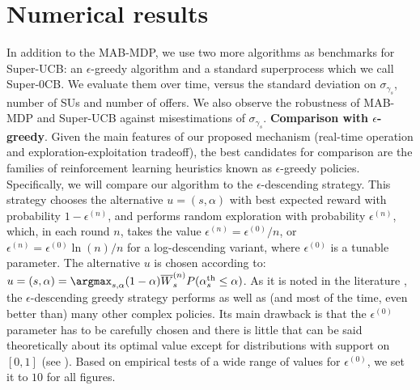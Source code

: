 \section{Numerical results}\label{sec:Num}
In addition to the MAB-MDP, we use two more algorithms as benchmarks for Super-UCB: an $\epsilon$-greedy algorithm and a standard superprocess which we call Super-0CB. We evaluate them over time, versus the standard deviation on $\sigma_{\gamma_s}$, number of SUs and number of offers. We also observe the robustness of MAB-MDP and Super-UCB against misestimations of $\sigma_{\gamma_s}$.
\textbf{Comparison with $\epsilon$-greedy}.
Given the main features of our proposed mechanism (real-time operation and exploration-exploitation tradeoff), the best candidates for comparison are the families of reinforcement learning heuristics \cite{ref:Vermorel2005} known as $\epsilon$-greedy policies.
Specifically, we will compare our algorithm to the $\epsilon$-descending strategy. 
This strategy chooses the alternative $u = (s,\alpha)$ with best expected reward with probability $1-\epsilon^{(n)}$, and performs random exploration with probability $\epsilon^{(n)}$, which, in each round $n$, takes the value $\epsilon^{(n)} = \epsilon^{(0)}/n$, or $\epsilon^{(n)} = \epsilon^{(0)}\ln(n)/n$ for a log-descending variant, where $\epsilon^{(0)}$ is a tunable parameter. The alternative $u$ is chosen according to: $u = (s,\alpha) = \argmax_{s,\alpha} (1-\alpha)\overline{W}^{(n)}_s P(\alpha_s^{\text{th}} \leq \alpha)$.
As it is noted in the literature \cite{ref:Auer2002,ref:Vermorel2005}, the $\epsilon$-descending greedy strategy performs as well as (and most of the time, even better than) many other complex policies. 
Its main drawback is that the $\epsilon^{(0)}$ parameter has to be carefully chosen and there is little that can be said theoretically about its optimal value except for distributions with support on $[0,1]$ (see \cite{ref:Auer2002}). 
Based on empirical tests of a wide range of values for $\epsilon^{(0)}$, we set it to $10$ for all figures. 

